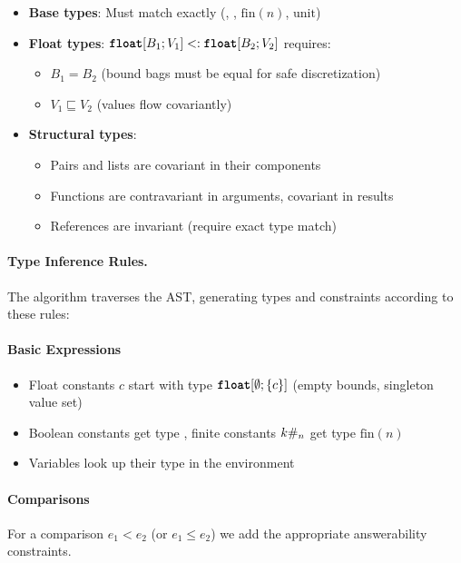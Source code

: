 \begin{itemize}
    \item \textbf{Base types}: Must match exactly (\bool{}, \intty{}, $\text{fin}(n)$, $\text{unit}$)
    \item \textbf{Float types}: $\textnormal{\ttfamily\bfseries float}[B_1; V_1] <: \textnormal{\ttfamily\bfseries float}[B_2; V_2]$ requires:
        \begin{itemize}
            \item $B_1 = B_2$ (bound bags must be equal for safe discretization)
            \item $V_1 \sqsubseteq V_2$ (values flow covariantly)
        \end{itemize}
    \item \textbf{Structural types}: 
        \begin{itemize}
            \item Pairs and lists are covariant in their components
            \item Functions are contravariant in arguments, covariant in results
            \item References are invariant (require exact type match)
        \end{itemize}
\end{itemize}

\paragraph{Type Inference Rules.}
The algorithm traverses the AST, generating types and constraints according to these rules:

\paragraph{Basic Expressions}
\begin{itemize}
    \item Float constants $c$ start with type $\textnormal{\ttfamily\bfseries float}[\emptyset; \{c\}]$ (empty bounds, singleton value set)
    \item Boolean constants get type \bool{}, finite constants $k\#_{n}$ get type $\text{fin}(n)$
    \item Variables look up their type in the environment
\end{itemize}

\paragraph{Comparisons} 

For a comparison $e_1 < e_2$ (or $e_1 \leq e_2$) we add the appropriate answerability constraints.

